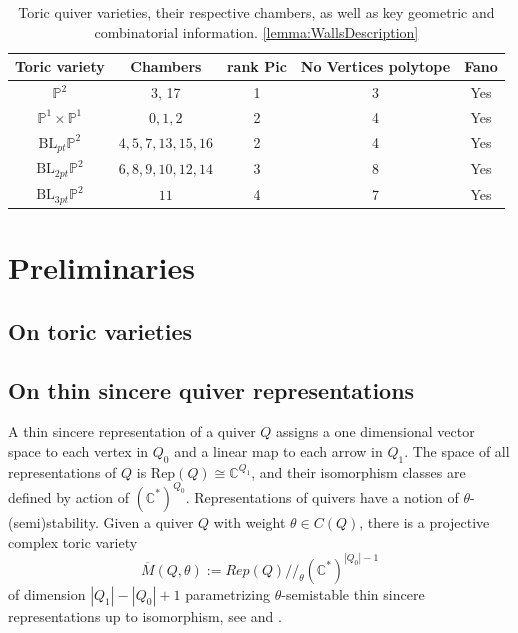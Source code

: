 \documentclass[11pt]{amsart}
\theoremstyle{plain}
\theoremstyle{definition}
\begin{document}
\begin{table}[!h]
\caption{
Toric quiver varieties, their respective chambers, as well  as key geometric and combinatorial information.
\ref{lemma:WallsDescription}
}
\label{table:ListToricQuivers}
\centering
\captionsetup[table]{skip=10pt}
\renewcommand{\arraystretch}{1.5} 
\begin{tabular}{|c|c|c|c|c|}
\hline
Toric variety & Chambers & rank Pic
& No Vertices polytope & Fano
\\ \hline
$\mathbb{P}^2$ & 3, 17 & 1 & 3 & Yes
\\ \hline
$\mathbb{P}^1 \times \mathbb{P}^1 $ 
& 
$0, 1, 2 $
& 2 & 4 & Yes
\\ \hline
$\text{BL}_{pt}\mathbb{P}^2$ & 
$4,5,7,13,15,16 $
& 2 & 4
& Yes
\\ \hline
$\text{BL}_{2pt}\mathbb{P}^2$ & 
$ 6,8,9,10,12,14 $
& 3 & 8
& Yes
\\ \hline
$\text{BL}_{3pt}\mathbb{P}^2$ & $11$  & 4 & 7
& Yes
\\ \hline
\end{tabular}
\end{table}


\section{Preliminaries}

\subsection{On toric varieties}


\subsection{On thin sincere quiver representations}
\label{subsec:PrelQuives}
A thin sincere representation of a quiver $Q$ assigns a one dimensional vector space to each vertex in $Q_0$ and a linear map to each arrow in $Q_1$.  
The space of all representations  of $Q$ is $\text{Rep}(Q) \cong \mathbb{C}^{Q_1}$, and their isomorphism classes are defined by action of $(\mathbb{C}^*)^{Q_0}$.   Representations of quivers have a notion of $\theta$-(semi)stability. Given a quiver $Q$ with weight $\theta \in C(Q)$, there is a projective complex toric variety 
$$
\overline{M}(Q, \theta) :=
Rep(Q) / \! \! /_{\theta} 
(\mathbb{C}^{*})^{|Q_0|-1}
$$
of dimension $|Q_1| - |Q_0| +1$ parametrizing $\theta$-semistable thin sincere representations up to isomorphism, see \cite{King1994} and \cite{Hille1998}. 
\end{document}

